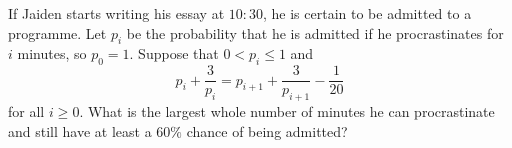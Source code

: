 If Jaiden starts writing his essay at $10{:}30$, he is certain to be admitted to a programme. Let $p_i$ be the probability that he is admitted if he procrastinates for $i$ minutes, so $p_0=1$. Suppose that $0<p_i\le1$ and
\[p_i+\dfrac{3}{p_i}=p_{i+1}+\dfrac{3}{p_{i+1}}-\dfrac1{20}\]
for all $i\ge0$. What is the largest whole number of minutes he can procrastinate and still have at least a $60\%$ chance of being admitted?
